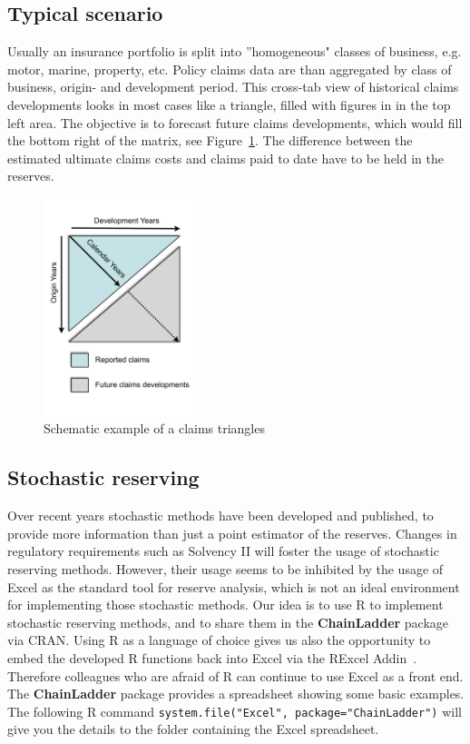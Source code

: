 \documentclass[a4paper]{article}
\newcommand{\pkg}[1]{\textbf{#1}}
\begin{document}
\subsection{Typical scenario}
Usually an insurance portfolio is split into ''homogeneous" classes of business,
e.g. motor, marine, property, etc. Policy claims data are than aggregated by class of business, origin- and development period. This cross-tab view of historical claims developments looks in most cases like a triangle, filled with figures in in the top left area. The objective is to forecast future claims developments, which would fill the bottom right of the matrix, see Figure~\ref{triangle}. The difference between the estimated ultimate claims costs and claims paid to date have to be held in the reserves.
\begin{figure}[h]
  \begin{center}
    \includegraphics[width=0.4\textwidth]{Triangles}
    \caption{Schematic example of a claims triangles}\label{triangle}
  \end{center}
\end{figure}

\subsection{Stochastic reserving }
Over recent years stochastic methods have been developed and published, to provide more information than just a point estimator of the reserves. Changes in regulatory requirements such as Solvency II will foster the usage of stochastic reserving methods.
However, their usage seems to be inhibited by the usage of Excel as the standard tool for reserve analysis, which  is not an ideal environment for implementing those stochastic methods.
Our idea is to use R to implement stochastic reserving
methods, and to share them in the \pkg{ChainLadder} package via CRAN.
Using R as a language of choice gives us also the opportunity to embed the developed R functions back into Excel via the RExcel Addin~\cite{rexcel}. Therefore colleagues who are afraid of R can continue to use Excel as a front end. The \pkg{ChainLadder} package provides a spreadsheet showing some basic examples. The following R command \texttt{system.file("Excel", package="ChainLadder")} will give you the details to the folder containing the Excel spreadsheet.
\end{document}
